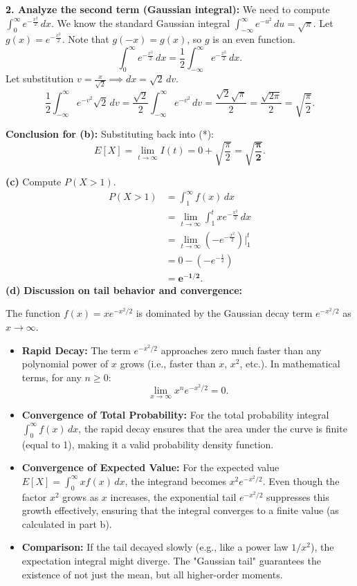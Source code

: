 \noindent \textbf{2. Analyze the second term (Gaussian integral):}
We need to compute $\int_{0}^{\infty} e^{-\frac{x^2}{2}} \, dx$.
We know the standard Gaussian integral $\int_{-\infty}^{\infty} e^{-u^2} \, du = \sqrt{\pi}$.
Let $g(x) = e^{-\frac{x^2}{2}}$. Note that $g(-x) = g(x)$, so $g$ is an even function.
\[
    \int_{0}^{\infty} e^{-\frac{x^2}{2}} \, dx = \frac{1}{2} \int_{-\infty}^{\infty} e^{-\frac{x^2}{2}} \, dx.
\]
Let substitution $v = \frac{x}{\sqrt{2}} \implies dx = \sqrt{2} \, dv$.
\[
    \frac{1}{2} \int_{-\infty}^{\infty} e^{-v^2} \sqrt{2} \, dv = \frac{\sqrt{2}}{2} \int_{-\infty}^{\infty} e^{-v^2} \, dv = \frac{\sqrt{2}\sqrt{\pi}}{2} = \frac{\sqrt{2\pi}}{2} = \sqrt{\frac{\pi}{2}}.
\]

\noindent \textbf{Conclusion for (b):}
Substituting back into (*):
\[
    E[X] = \lim_{t \to \infty} I(t) = 0 + \sqrt{\frac{\pi}{2}} = \mathbf{\sqrt{\frac{\pi}{2}}}.
\]

\vspace{1em}

\textbf{(c)} Compute $P(X > 1)$.
\begin{align*}
    P(X > 1) &= \int_{1}^{\infty} f(x) \, dx \\
    &= \lim_{t \to \infty} \int_{1}^{t} x e^{-\frac{x^2}{2}} \, dx \\
    &= \lim_{t \to \infty} \left( -e^{-\frac{x^2}{2}} \right) \Bigg|_{1}^{t} \\
    &= 0 - \left( -e^{-\frac{1}{2}} \right) \\
    &= \mathbf{e^{-1/2}}.
\end{align*}
\textbf{(d)} \quad \textbf{Discussion on tail behavior and convergence:}

The function $f(x) = x e^{-x^2/2}$ is dominated by the Gaussian decay term $e^{-x^2/2}$ as $x \to \infty$.

\begin{itemize}
    \item \textbf{Rapid Decay:} The term $e^{-x^2/2}$ approaches zero much faster than any polynomial power of $x$ grows (i.e., faster than $x$, $x^2$, etc.). In mathematical terms, for any $n \ge 0$:
    \[ \lim_{x \to \infty} x^n e^{-x^2/2} = 0. \]
    
    \item \textbf{Convergence of Total Probability:} For the total probability integral $\int_{0}^{\infty} f(x) \, dx$, the rapid decay ensures that the area under the curve is finite (equal to 1), making it a valid probability density function.
    
    \item \textbf{Convergence of Expected Value:} For the expected value $E[X] = \int_{0}^{\infty} x f(x) \, dx$, the integrand becomes $x^2 e^{-x^2/2}$. Even though the factor $x^2$ grows as $x$ increases, the exponential tail $e^{-x^2/2}$ suppresses this growth effectively, ensuring that the integral converges to a finite value (as calculated in part b).
    
    \item \textbf{Comparison:} If the tail decayed slowly (e.g., like a power law $1/x^2$), the expectation integral might diverge. The "Gaussian tail" guarantees the existence of not just the mean, but all higher-order moments.
\end{itemize}
\pagebreak